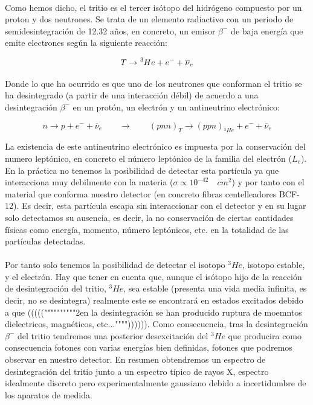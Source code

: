 \documentclass[11pt, a4paper]{article}
\begin{document}
\paragraph {}
Como hemos dicho, el tritio es el tercer isótopo del hidrógeno compuesto por un proton y dos neutrones. Se trata de un elemento radiactivo con un periodo de semidesintegración de 12.32 años, en concreto, un emisor $\beta^-$ de baja energía que emite electrones según la siguiente reacción:

$$T \rightarrow \ce{^{3}{He}} + e^- + \overline{\nu}_e$$

Donde lo que ha ocurrido es que uno de los neutrones que conforman el tritio se ha desintegrado (a partir de una interacción débil) de acuerdo a una desintegración $\beta^-$ en un protón, un electrón y un antineutrino electrónico:

$$n \rightarrow p + e^- + \overline{\nu}_e \qquad \rightarrow \qquad (pnn)_T\rightarrow (ppn)_{^3He} + e^- + \overline{\nu}_e $$

La existencia de este antineutrino electrónico es impuesta por la conservación del numero leptónico, en concreto el número leptónico de la familia del electrón ($L_e$). En la práctica no tenemos la posibilidad de detectar esta partícula ya que interacciona muy debilmente con la materia ($\sigma \propto 10^{-42} \quad cm^2$) y por tanto con el material que conforma nuestro detector (en concreto fibras centelleadores BCF-12). Es decir, esta partícula escapa sin interaccionar con el detector y en su lugar solo detectamos su ausencia, es decir, la no conservación de ciertas cantidades físicas como energía, momento, número leptónicos, etc. en la totalidad de las partículas detectadas.

\paragraph {}
Por tanto solo tenemos la posibilidad de detectar el isotopo $^3He$, isotopo estable, y el electrón. Hay que tener en cuenta que, aunque el isótopo hijo de la reacción de desintegración del tritio, $^3He$, sea estable (presenta una vida media infinita, es decir, no se desintegra) realmente este se encontrará en estados excitados debido a que (((((""""""""""2en la desintegración se han producido ruptura de moemntos dielectricos, magnéticos, etc..."""")))))). Como consecuencia, tras la desintegración $\beta^-$ del tritio tendremos una posterior desexcitación del $^3He$ que producira como consecuencia fotones con varias energías bien definidas, fotones que podremos observar en nuestro detector. En resumen obtendremos un espectro de desintegración del tritio junto a un espectro típico de rayos X, espectro idealmente discreto pero experimentalmente gaussiano debido a incertidumbre de los aparatos de medida.
\end{document}
